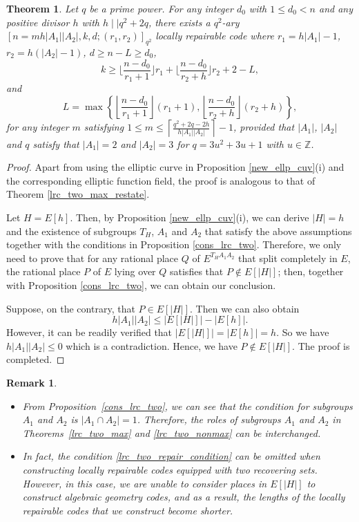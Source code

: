 \documentclass[journal,12pt,onecolumn]{IEEEtran}
\newtheorem{theorem}{Theorem}
\newtheorem{remark}{Remark}
\begin{document}
\begin{theorem}
    Let \( q \) be a prime power. For any integer \( d_0 \) with \( 1 \leq d_0 < n \) and any positive divisor \( h \) with \(h\mid\mid q^2+2q\), there exists a \( q^2 \)-ary \([n = mh|A_1||A_2|, k, d;(r_1,r_2)]_{q^2}\) locally repairable code where \( r_1 = h|A_1| - 1 \), \(r_2 = h(|A_2|-1)\), \(d \ge n - L \ge d_0\), 
    \[
        k \geq \bigg\lfloor\frac{n-d_0}{r_1 + 1}\bigg\rfloor r_1 + \bigg\lfloor\frac{n-d_0}{r_2 + h}\bigg\rfloor r_2  + 2 - L,
    \]
    and
    \[
        L = \max\left\{\left\lfloor\frac{n-d_0}{r_1 + 1}\right\rfloor (r_1+1),\left\lfloor\frac{n-d_0}{r_2 + h}\right\rfloor (r_2 + h)\right\} , 
    \]
     for any integer \( m \) satisfying \(1 \leq m \leq \left\lceil \frac{q^2+2q-2h}{h|A_1||A_2|} \right\rceil - 1 \), provided that \(|A_1|\), \(|A_2|\) and \( q \) satisfy that \(|A_1| = 2\) and \(|A_2| = 3\) for \(q = 3u^2 + 3u + 1\) with \(u\in\mathbb{Z}\). 
\end{theorem}
\begin{proof}
    Apart from using the elliptic curve in Proposition \ref{new_ellp_cuv}(i) and the corresponding elliptic function field, the proof is analogous to that of Theorem \ref{lrc_two_max_restate}. 
    
    Let \(H = E[h]\). Then, by Proposition \ref{new_ellp_cuv}(i), we can derive \(|H| = h\) and the existence of subgroups \(T_H\), \(A_1\) and \(A_2\) that satisfy the above assumptions together with the conditions in Proposition \ref{cons_lrc_two}. Therefore, we only need to prove that for any rational place \(Q\) of \( E^{T_HA_1A_2} \) that split completely in \( E \), the rational place $P$ of $E$ lying over $Q$ satisfies that \(P\notin E[|H|]\); then, together with Proposition \ref{cons_lrc_two}, we can obtain our conclusion. 

    Suppose, on the contrary, that \(P\in E[|H|]\). Then we can also obtain 
    \[
        h|A_1||A_2|\le |E[|H|]|-|E[h]|.
    \]
    However, it can be readily verified that \(|E[|H|]|=|E[h]|=h\). So we have \(h|A_1||A_2|\le 0 \) which is a contradiction. Hence, we have \(P\notin E[|H|]\). The proof is completed. 
\end{proof}



\begin{remark}\label{lrc_two_re}
    \begin{itemize}
        \item[(i)] From Proposition~\ref{cons_lrc_two}, we can see that the condition for subgroups \(A_1\) and \( A_2 \) is \( |A_1\cap A_2| = 1 \). Therefore, the roles of subgroups \( A_1 \) and \( A_2 \) in Theorems~\ref{lrc_two_max} and \ref{lrc_two_nonmax} can be interchanged.
        \item[(ii)] In fact, the condition \eqref{lrc_two_repair_condition} can be omitted when constructing locally repairable codes equipped with two recovering sets. However, in this case, we are unable to consider places in \( E[|H|] \) to construct algebraic geometry codes, and as a result, the lengths of the locally repairable codes that we construct become shorter.
    \end{itemize}
\end{remark}
\end{document}

